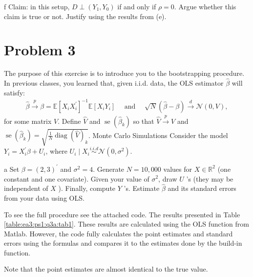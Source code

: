 \documentclass{article}
\begin{document}
\begin{problem}{f}
Claim: in this setup, $D \perp\left(Y_{1}, Y_{0}\right)$ if and only if $\rho=0$. Argue whether this claim is true or not. Justify using the results from (e).
\end{problem}
\begin{solution}

\end{solution}


\newpage

\section*{Problem 3}
The purpose of this exercise is to introduce you to the bootstrapping procedure. In previous classes, you learned that, given i.i.d. data, the OLS estimator $\hat{\beta}$ will satisfy:
\begin{align*}
\hat{\beta} \stackrel{p}{\rightarrow} \beta=\mathbb{E}\left[X_{i} X_{i}^{\prime}\right]^{-1} \mathbb{E}\left[X_{i} Y_{i}\right] \quad \text { and } \quad \sqrt{N}(\hat{\beta}-\beta) \stackrel{d}{\rightarrow} \mathcal{N}(0, V),
\end{align*}
for some matrix $V$. Define $\hat{V}$ and $\operatorname{se}\left(\hat{\beta}_{k}\right)$ so that $\hat{V} \stackrel{p}{\rightarrow} V$ and $\operatorname{se}\left(\hat{\beta}_{k}\right)=\sqrt{\frac{1}{N} \operatorname{diag}(\hat{V})_{k}}$.
Monte Carlo Simulations
Consider the model $Y_{i}=X_{i}^{\prime} \beta+U_{i}$, where $U_{i} \mid X_{i} \stackrel{i . i . d}{\sim} \mathcal{N}\left(0, \sigma^{2}\right)$.
\begin{problem}{a}
Set $\beta=(2,3)^{\prime}$ and $\sigma^{2}=4$. Generate $N=10,000$ values for $X \in \mathbb{R}^{2}$ (one constant and one covariate). Given your value of $\sigma^{2}$, draw $U$ 's (they may be independent of $X$ ). Finally, compute $Y$ 's. Estimate $\hat{\beta}$ and its standard errors from your data using OLS.
\end{problem}
\begin{solution}
To see the full procedure see the attached code. The results presented in Table \ref{table:ea3:ps1:q3a:tab1}. These results are calculated using the OLS function from Matlab. However, the code fully calculates the point estimates and standard errors using the formulas and compares it to the estimates done by the build-in function. 

Note that the point estimates are almost identical to the true value. 
\end{solution}
\end{document}
